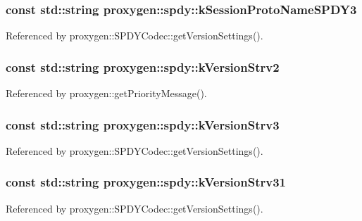 \subsubsection[{k\+Session\+Proto\+Name\+S\+P\+D\+Y3}]{\setlength{\rightskip}{0pt plus 5cm}const std\+::string proxygen\+::spdy\+::k\+Session\+Proto\+Name\+S\+P\+D\+Y3}\label{namespaceproxygen_1_1spdy_a1c5c100098f94865ba8c5c1e47a9f7e8}


Referenced by proxygen\+::\+S\+P\+D\+Y\+Codec\+::get\+Version\+Settings().

\subsubsection[{k\+Version\+Strv2}]{\setlength{\rightskip}{0pt plus 5cm}const std\+::string proxygen\+::spdy\+::k\+Version\+Strv2}\label{namespaceproxygen_1_1spdy_a865d59c4d11c8d1f013f40cf6d18f0b8}


Referenced by proxygen\+::get\+Priority\+Message().

\subsubsection[{k\+Version\+Strv3}]{\setlength{\rightskip}{0pt plus 5cm}const std\+::string proxygen\+::spdy\+::k\+Version\+Strv3}\label{namespaceproxygen_1_1spdy_afcd2294577af5ecdec202e35d91cf7f1}


Referenced by proxygen\+::\+S\+P\+D\+Y\+Codec\+::get\+Version\+Settings().

\subsubsection[{k\+Version\+Strv31}]{\setlength{\rightskip}{0pt plus 5cm}const std\+::string proxygen\+::spdy\+::k\+Version\+Strv31}\label{namespaceproxygen_1_1spdy_a10c78d8f4f818571b707fdb1c69f7aec}


Referenced by proxygen\+::\+S\+P\+D\+Y\+Codec\+::get\+Version\+Settings().

